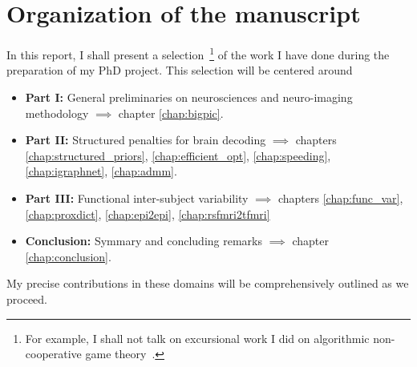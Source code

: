 \section{Organization of the manuscript}
In this report, I shall present a selection~\footnote{For example, I shall not talk on excursional work I did on algorithmic non-cooperative game theory~\citep{dohmatob2015simple}.} of the work I have done during the preparation of my PhD project.  This selection will be centered around
\begin{itemize}
\item \textbf{Part I:} General preliminaries on neurosciences and neuro-imaging methodology $\implies$ chapter \ref{chap:bigpic}.
\item \textbf{Part II:} Structured penalties for brain decoding $\implies$ chapters \ref{chap:structured_priors}, \ref{chap:efficient_opt}, \ref{chap:speeding}, \ref{chap:igraphnet}, \ref{chap:admm}.
\item \textbf{Part III:} Functional inter-subject variability $\implies$ chapters \ref{chap:func_var}, \ref{chap:proxdict}, \ref{chap:epi2epi}, \ref{chap:rsfmri2tfmri}
\item \textbf{Conclusion:} Symmary and concluding remarks $\implies$ chapter \ref{chap:conclusion}.
\end{itemize}
My precise contributions in these domains will be comprehensively outlined  as we proceed.



